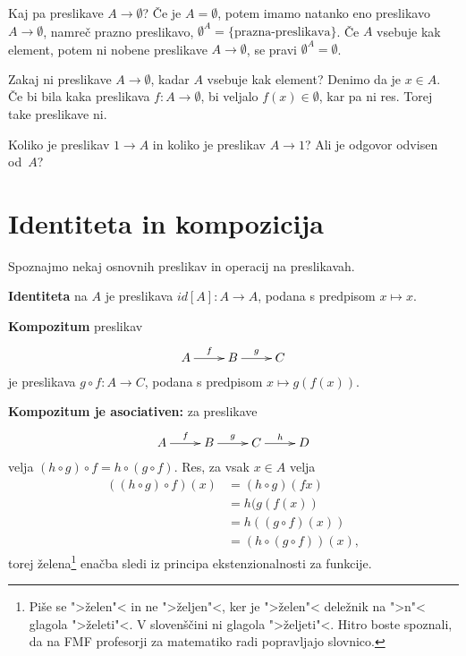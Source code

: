 Kaj pa preslikave $A \to \emptyset$?
%
Če je $A = \emptyset$, potem imamo natanko eno preslikavo $A \to \emptyset$, namreč prazno preslikavo, $\emptyset^A = \{ \textrm{prazna-preslikava} \}$.
%
Če $A$ vsebuje kak element, potem ni nobene preslikave $A \to \emptyset$, se pravi  $\emptyset^A = \emptyset$.

Zakaj ni preslikave $A \to \emptyset$, kadar $A$ vsebuje kak element? Denimo da je $x \in A$. Če bi bila kaka preslikava $f : A \to \emptyset$, bi
veljalo $f(x) \in \emptyset$, kar pa ni res. Torej take preslikave ni.

\begin{naloga}
  Koliko je preslikav $1 \to A$ in koliko je preslikav $A \to 1$?
  Ali je odgovor odvisen od~$A$?
\end{naloga}

\section{Identiteta in kompozicija}

Spoznajmo nekaj osnovnih preslikav in operacij na preslikavah.

\textbf{Identiteta} na $A$ je preslikava $id[A] : A \to A$, podana s predpisom $x \mapsto x$.

\textbf{Kompozitum} preslikav
%
\begin{equation*}
  \xymatrix{
    {A} \ar[r]^f & {B} \ar[r]^g & {C}
  }
\end{equation*}
%
je preslikava $g \circ f : A \to C$, podana s predpisom $x \mapsto g(f(x))$.

\textbf{Kompozitum je asociativen:} za preslikave
%
\begin{equation*}
  \xymatrix{
    {A} \ar[r]^f & {B} \ar[r]^g & {C} \ar[r]^h & {D}
  }
\end{equation*}
%
velja $(h \circ g) \circ f = h \circ (g \circ f)$. Res, za vsak $x \in A$ velja
%
\begin{align*}
  ((h \circ g) \circ f)(x)
  &= (h \circ g) (f x) \\
  &=  h (g (f (x)) \\
  &= h ((g \circ f)(x)) \\
  &= (h \circ (g \circ f))(x),
\end{align*}
%
torej želena\footnote{Piše se ">želen"< in ne ">željen"<, ker je ">želen"< deležnik na
  ">n"< glagola ">želeti"<. V slovenščini ni glagola ">željeti"<. Hitro boste spoznali, da na FMF profesorji za matematiko radi popravljajo slovnico.} enačba sledi iz principa ekstenzionalnosti za funkcije.

